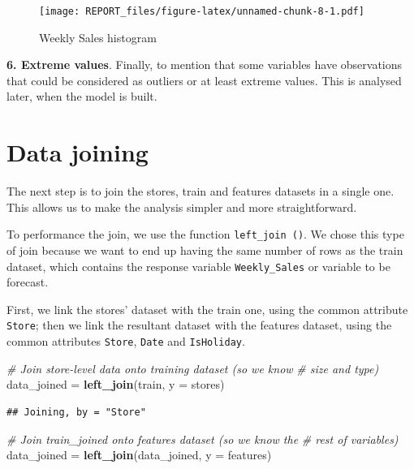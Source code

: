 \documentclass[11pt,]{article}
\newenvironment{Shaded}{\begin{snugshade}}{\end{snugshade}}
\newcommand{\KeywordTok}[1]{\textcolor[rgb]{0.13,0.29,0.53}{\textbf{{#1}}}}
\newcommand{\DataTypeTok}[1]{\textcolor[rgb]{0.13,0.29,0.53}{{#1}}}
\newcommand{\StringTok}[1]{\textcolor[rgb]{0.31,0.60,0.02}{{#1}}}
\newcommand{\CommentTok}[1]{\textcolor[rgb]{0.56,0.35,0.01}{\textit{{#1}}}}
\newcommand{\NormalTok}[1]{{#1}}
\begin{document}
\begin{figure}[htbp]
\centering
\texttt{[image: REPORT\_files/figure-latex/unnamed-chunk-8-1.pdf]}
\caption{Weekly Sales histogram}
\end{figure}

\textbf{6. Extreme values}. Finally, to mention that some variables have
observations that could be considered as outliers or at least extreme
values. This is analysed later, when the model is built.

\section{Data joining}\label{data-joining}

The next step is to join the stores, train and features datasets in a
single one. This allows us to make the analysis simpler and more
straightforward.

To performance the join, we use the function \texttt{left\_join\ ()}. We
chose this type of join because we want to end up having the same number
of rows as the train dataset, which contains the response variable
\texttt{Weekly\_Sales} or variable to be forecast.

First, we link the stores' dataset with the train one, using the common
attribute \texttt{Store}; then we link the resultant dataset with the
features dataset, using the common attributes \texttt{Store},
\texttt{Date} and \texttt{IsHoliday}.

\begin{Shaded}
\begin{Highlighting}[]
\CommentTok{# Join store-level data onto training dataset (so we know}
\CommentTok{# size and type)}
\NormalTok{data_joined =}\StringTok{ }\KeywordTok{left_join}\NormalTok{(train, }\DataTypeTok{y =} \NormalTok{stores)}
\end{Highlighting}
\end{Shaded}

\begin{verbatim}
## Joining, by = "Store"
\end{verbatim}

\begin{Shaded}
\begin{Highlighting}[]
\CommentTok{# Join train_joined onto features dataset (so we know the}
\CommentTok{# rest of variables)}
\NormalTok{data_joined =}\StringTok{ }\KeywordTok{left_join}\NormalTok{(data_joined, }\DataTypeTok{y =} \NormalTok{features)}
\end{Highlighting}
\end{Shaded}
\end{document}
